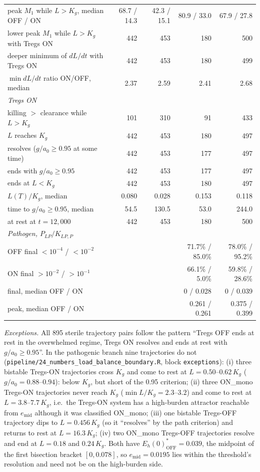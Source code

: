 \documentclass[11pt]{article}
\begin{document}
\begin{table}[H]
{\begin{tabular}{lrrrr}
peak $M_1$ while $L>K_g$, median OFF / ON & 68.7 / 14.3 & 42.3 / 15.1 & 80.9 / 33.0 & 67.9 / 27.8\\
lower peak $M_1$ while $L>K_g$ with Tregs ON & 442 & 453 & 180 & 500\\
deeper minimum of $dL/dt$ with Tregs ON & 442 & 453 & 180 & 499\\
$\min dL/dt$ ratio ON/OFF, median & 2.37 & 2.59 & 2.41 & 2.68\\
\multicolumn{5}{l}{\emph{Tregs ON}}\\
killing $>$ clearance while $L>K_g$ & 101 & 310 & 91 & 433\\
$L$ reaches $K_g$ & 442 & 453 & 180 & 497\\
resolves ($g/a_0\ge0.95$ at some time) & 442 & 453 & 177 & 497\\
ends with $g/a_0 \ge 0.95$ & 442 & 453 & 177 & 497\\
ends at $L<K_g$ & 442 & 453 & 180 & 497\\
$L(T)/K_g$, median & 0.080 & 0.028 & 0.153 & 0.118\\
time to $g/a_0 \ge 0.95$, median & 54.5 & 130.5 & 53.0 & 244.0\\
at rest at $t=12{,}000$ & 442 & 453 & 180 & 500\\
\multicolumn{5}{l}{\emph{Pathogen, $P_{LP}/K_{LP,P}$}}\\
OFF final $<10^{-4}$ / $<10^{-2}$ & & & 71.7\% / 85.0\% & 78.0\% / 95.2\%\\
ON final $>10^{-2}$ / $>10^{-1}$ & & & 66.1\% / 5.0\% & 59.8\% / 28.6\%\\
final, median OFF / ON & & & 0 / 0.028 & 0 / 0.039\\
peak, median OFF / ON & & & 0.261 / 0.261 & 0.375 / 0.399\\
\bottomrule
\end{tabular}}
\end{table}

\emph{Exceptions.} All 895 sterile trajectory pairs follow the pattern
``Tregs OFF ends at rest in the overwhelmed regime, Tregs ON resolves and ends at rest with
$g/a_0\ge0.95$''. In the pathogenic branch nine trajectories do not
(\texttt{pipeline/24\_numbers\_load\_balance\_boundary.R}, block \texttt{exceptions}):
(i) three bistable Tregs-ON trajectories cross $K_g$ and come to rest at
$L = 0.50$--$0.62\,K_g$ ($g/a_0 = 0.88$--$0.94$): below $K_g$, but short of the 0.95 criterion;
(ii) three ON\_mono Tregs-ON trajectories never reach $K_g$ ($\min L/K_g = 2.3$--$3.2$) and come
to rest at $L = 3.8$--$7.7\,K_g$, i.e.\ the Tregs-ON system has a high-burden attractor
reachable from $e_{\mathrm{mid}}$ although it was classified ON\_mono;
(iii) one bistable Tregs-OFF trajectory dips to $L = 0.456\,K_g$ (so it ``resolves'' by the
path criterion) and returns to rest at $L=16.3\,K_g$;
(iv) two ON\_mono Tregs-OFF trajectories resolve and end at $L = 0.18$ and $0.24\,K_g$. Both have
$E_h(0)^*_{\mathrm{OFF}} = 0.039$, the midpoint of the first bisection bracket $[0, 0.078]$, so
$e_{\mathrm{mid}} = 0.0195$ lies within the threshold's resolution and need not be on the
high-burden side.
\end{document}
